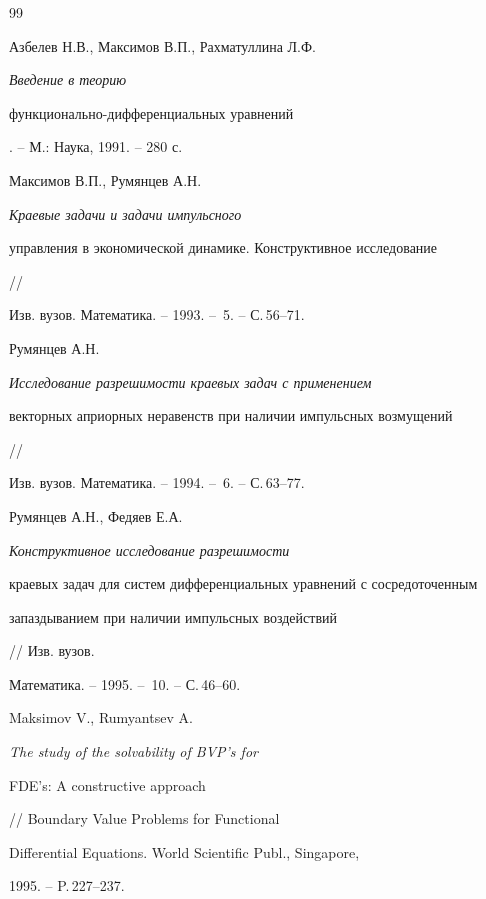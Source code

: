 \begin{thebibliography}{99} 


 




Азбелев Н.В., Максимов В.П., Рахматуллина Л.Ф. {\em Введение в теорию


функционально-дифференциальных уравнений}. -- М.: Наука, 1991. -- 280 с.







Максимов В.П., Румянцев А.Н. {\em Краевые задачи и задачи импульсного


управления в экономической динамике. Конструктивное исследование} //


Изв. вузов. Математика. -- 1993. -- \No\,5. -- С.\,56--71.







Румянцев А.Н. {\em Исследование разрешимости краевых задач с применением


векторных априорных неравенств при наличии импульсных возмущений} //


Изв. вузов. Математика. -- 1994. -- \No\,6. -- С.\,63--77.







Румянцев А.Н., Федяев Е.А. {\em Конструктивное исследование разрешимости


краевых задач для систем дифференциальных уравнений с сосредоточенным


запаздыванием при наличии импульсных воздействий} // Изв. вузов.


Математика. -- 1995. -- \No\,10. -- С.\,46--60.







Maksimov V., Rumyantsev A. {\em The study of the solvability of BVP's for


FDE's: A constructive approach} // Boundary Value Problems for Functional


Differential Equations. World Scientific Publ., Singapore, 


1995. -- P.\,227--237.








\end{thebibliography}

